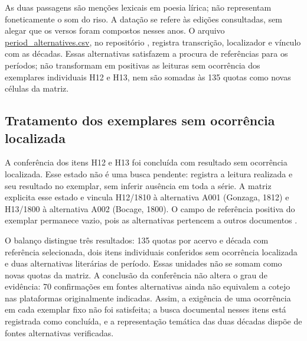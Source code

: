 As duas passagens são menções lexicais em poesia lírica; não representam foneticamente o som do riso. A datação se refere às edições consultadas, sem alegar que os versos foram compostos nesses anos. O arquivo \href{https://github.com/murilloed/historia-riso-escrito-portugues/blob/main/data/period_alternatives.csv}{period\_alternatives.csv}, no repositório \repo, registra transcrição, localizador e vínculo com as décadas. Essas alternativas satisfazem a procura de referências para os períodos; não transformam em positivas as leituras sem ocorrência dos exemplares individuais H12 e H13, nem são somadas às 135 quotas como novas células da matriz.

\subsection{Tratamento dos exemplares sem ocorrência localizada}

A conferência dos itens H12 e H13 foi concluída com resultado sem ocorrência localizada. Esse estado não é uma busca pendente: registra a leitura realizada e seu resultado no exemplar, sem inferir ausência em toda a série. A matriz explicita esse estado e vincula H12/1810 à alternativa A001 (Gonzaga, 1812) e H13/1800 à alternativa A002 (Bocage, 1800). O campo de referência positiva do exemplar permanece vazio, pois as alternativas pertencem a outros documentos \cite{altGonzaga1812,altBocage1800}.

O balanço distingue três resultados: 135 quotas por acervo e década com referência selecionada, dois itens individuais conferidos sem ocorrência localizada e duas alternativas literárias de período. Essas unidades não se somam como novas quotas da matriz. A conclusão da conferência não altera o grau de evidência: 70 confirmações em fontes alternativas ainda não equivalem a cotejo nas plataformas originalmente indicadas. Assim, a exigência de uma ocorrência em cada exemplar fixo não foi satisfeita; a busca documental nesses itens está registrada como concluída, e a representação temática das duas décadas dispõe de fontes alternativas verificadas.
